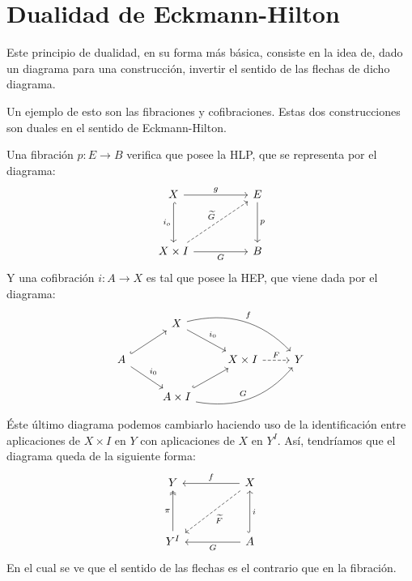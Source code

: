 \section{Dualidad de Eckmann-Hilton}
Este principio de dualidad, en su forma más básica, consiste en la idea de, dado un diagrama para una construcción, invertir el sentido de las flechas de dicho diagrama. \par 
Un ejemplo de esto son las fibraciones y cofibraciones. Estas dos construcciones son duales en el sentido de Eckmann-Hilton. \par
Una fibración $p : E \longrightarrow B$ verifica que posee la HLP, que se representa por el diagrama:
\[
\begin{tikzcd}
X \arrow{rr}{g} \arrow[hook, swap]{dd}{i_o} &  & E \arrow{dd}{p} \\
\\
X \times I \arrow{rr}[swap]{G} \arrow[dashed]{uurr}{\widetilde{G}} & & B
\end{tikzcd}
\]
Y una cofibración $i : A \longrightarrow X$ es tal que posee la HEP, que viene dada por el diagrama:
\[
\begin{tikzcd}
	{} 						  & X \drar{i_0} \arrow[bend left]{drr}{f}			   &        					&   \\
	A \urar[hook] \drar{i_0}  &   												   & X \times I \rar[dashed]{F} & Y \\
	   						  & A \times I  \urar[hook] \arrow[bend right]{urr}{G} &   							&
\end{tikzcd}
\]
Éste último diagrama podemos cambiarlo haciendo uso de la identificación entre aplicaciones de $X \times I$ en  $Y$ con aplicaciones de $X$ en $Y^I$. Así, tendríamos que el diagrama queda de la siguiente forma:\[
\begin{tikzcd}
Y & & X \arrow{ll}[swap]{f} \arrow[dashed]{ddll}{\widetilde{F}} \\
\\
Y^I \arrow[two heads]{uu}{\pi} & & A \arrow[hook,swap]{uu}{i} \arrow{ll}{G}
\end{tikzcd}
\]
En el cual se ve que el sentido de las flechas es el contrario que en la fibración. \par
